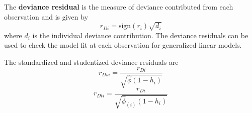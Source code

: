 \documentclass[12pt, a4paper]{report}
\theoremstyle{plain}
\theoremstyle{definition}
\theoremstyle{remark}
\begin{document}
The \textbf{deviance residual} is the measure of deviance contributed from each observation and is given by
\[r_{Di} = \textrm{sign}( r_{i})
\sqrt{ d_{i}}\]
where $d_i$ is the individual deviance contribution.
The deviance residuals can be used to check the model fit at each observation for generalized linear models. 


The standardized and studentized deviance residuals are
\[
r_{Dsi} = \frac{r_{Di}}{\sqrt{\hat{ \phi} (1- h_{i})} }\]
\[r_{Dti} = \frac{r_{Di}}{\sqrt{ \hat{ \phi}_{(i)}
		(1- h_{i})}}\]



\end{document}
